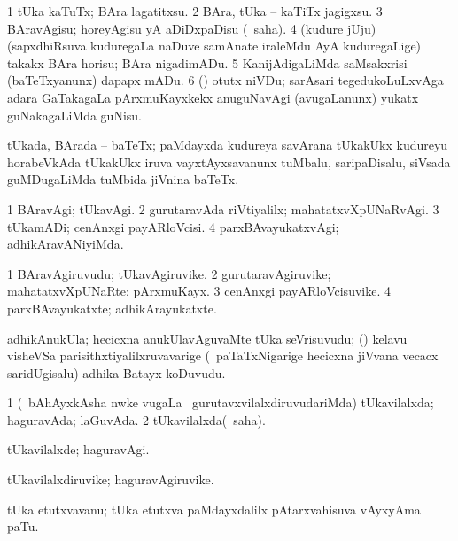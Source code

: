 \bentry
{} 
\gl{\sakirx}
\expl{}
\bmng
\bnum
\num{1} tUka kaTuTx; BAra lagatitxsu. 
\num{2} BAra, tUka -- kaTiTx jagigxsu. 
\num{3} BAravAgisu; horeyAgisu yA aDiDxpaDisu (\rUpa\ saha). 
\num{4} (kudure jUju) (sapxdhiRsuva kuduregaLa naDuve samAnate iraleMdu AyA kuduregaLige) takakx BAra horisu; BAra nigadimADu. 
\num{5} KanijAdigaLiMda saMsakxrisi (baTeTxyanunx) dapapx mADu. 
\num{6} (\saMshA) otutx niVDu; sarAsari tegedukoLuLxvAga adara GaTakagaLa pArxmuKayxkekx anuguNavAgi (avugaLanunx) yukatx guNakagaLiMda guNisu. 
\enum
\emng
\eentry

\bentry
{} 
\gl{\nA}
\expl{}
\bmng
tUkada, BArada -- baTeTx; paMdayxda kudureya savArana tUkakUkx kudureyu horabeVkAda tUkakUkx iruva vayxtAyxsavanunx tuMbalu, saripaDisalu, siVsada guMDugaLiMda tuMbida jiVnina baTeTx. 
\emng
\eentry

\bentry
{} 
\gl{\kirxvi}
\expl{}
\bmng
\bnum
\num{1} BAravAgi; tUkavAgi. 
\num{2} gurutaravAda riVtiyalilx; mahatatxvXpUNaRvAgi. 
\num{3} tUkamADi; cenAnxgi payARloVcisi. 
\num{4} parxBAvayukatxvAgi; adhikAravANiyiMda. 
\enum
\emng
\eentry

\bentry
{} 
\gl{\nA}
\expl{}
\bmng
\bnum
\num{1} BAravAgiruvudu; tUkavAgiruvike. 
\num{2} gurutaravAgiruvike; mahatatxvXpUNaRte; pArxmuKayx. 
\num{3} cenAnxgi payARloVcisuvike. 
\num{4} parxBAvayukatxte; adhikArayukatxte. 
\enum
\emng
\eentry

\bentry
{} 
\gl{\nA}
\expl{}
\bmng
adhikAnukUla; hecicxna anukUlavAguvaMte tUka seVrisuvudu; (\kanmu) kelavu visheVSa parisithxtiyalilxruvavarige (\udA\ paTaTxNigarige hecicxna jiVvana vecacx saridUgisalu) adhika Batayx koDuvudu. 
\emng
\eentry

\bentry
{} 
\gl{\gu}
\expl{}
\bmng
\bnum
\num{1} (\kanmu\ bAhAyxkAsha nwke \mo vugaLa \vi\ gurutavxvilalxdiruvudariMda) tUkavilalxda; haguravAda; laGuvAda. 
\num{2} tUkavilalxda(\rUpa\ saha). 
\enum
\emng
\eentry

\bentry
{} 
\gl{\kirxvi}
\expl{}
\bmng
tUkavilalxde; haguravAgi. 
\emng
\eentry

\bentry
{} 
\gl{\nA}
\expl{}
\bmng
tUkavilalxdiruvike; haguravAgiruvike. 
\emng
\eentry

\bentry
{} 
\gl{\nA}
\expl{}
\bmng
tUka etutxvavanu; tUka etutxva paMdayxdalilx pAtarxvahisuva vAyxyAma paTu. 
\emng
\eentry


